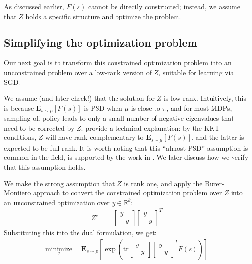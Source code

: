 \documentclass[11pt]{article}
\newcommand{\E}{\textbf{E}}
\newcommand{\tr}{\text{tr}}
\begin{document}
As discussed earlier, $F(s)$ cannot be directly constructed; instead, we assume that $Z$ holds a specific structure and optimize the problem.


\subsection{Simplifying the optimization problem}

Our next goal is to transform this constrained optimization problem into an unconstrained problem over a low-rank version of $Z$, suitable for learning via SGD.

We assume (and later check!) that the solution for $Z$ is low-rank. Intuitively, this is because $\E_{s\sim\mu}[F(s)]$ is PSD when $\mu$ is close to $\pi$, and for most MDPs, sampling off-policy leads to only a small number of negative eigenvalues that need to be corrected by $Z$. \citet{kolter2011fixed} provide a technical explanation: by the KKT conditions, $Z$ will have rank complementary to $\E_{s\sim\mu}[F(s)]$, and the latter is expected to be full rank. It is worth noting that this ``almost-PSD'' assumption is common in the field, is supported by the work in \cite{manek2022pitfalls}. We later discuss how we verify that this assumption holds.

We make the strong assumption that $Z$ is rank one, and apply the Burer-Montiero approach \cite{burer2003nonlinear} to convert the constrained optimization problem over $Z$ into an unconstrained optimization over $y\in \mathbb R^{k}$:
\begin{align}
  Z^\star & = \begin{bmatrix} y \\ -y \end{bmatrix} \begin{bmatrix} y \\ -y\end{bmatrix}^T
\end{align}
Substituting this into the dual formulation, we get:
\begin{align}
\underset{y}{\text{minimize}} & \;\; \mathbf{E}_{s\sim\mu} \left [ \exp\left (\tr  \begin{bmatrix} y \\ -y \end{bmatrix} \begin{bmatrix} y \\ -y\end{bmatrix}^T F(s) \right )  \right ]
\end{align}
\end{document}
